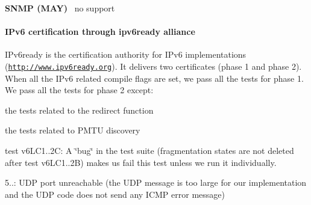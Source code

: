 {\bfseries S\+N\+MP (M\+AY)}~\newline
 no support\hypertarget{a00075_ipv6ready}{}\paragraph{I\+Pv6 certification through ipv6ready alliance}\label{a00075_ipv6ready}
I\+Pv6ready is the certification authority for I\+Pv6 implementations (\href{http://www.ipv6ready.org}{\tt http\+://www.\+ipv6ready.\+org}). It delivers two certificates (phase 1 and phase 2).~\newline
When all the I\+Pv6 related compile flags are set, we pass all the tests for phase 1.~\newline
We pass all the tests for phase 2 except\+: \begin{DoxyItemize}
\item the tests related to the redirect function \item the tests related to P\+M\+TU discovery \item test v6\+L\+C1..\+2C\+: A \char`\"{}bug\char`\"{} in the test suite (fragmentation states are not deleted after test v6\+L\+C1..\+2B) makes us fail this test unless we run it individually. \item 5..\+: U\+DP port unreachable (the U\+DP message is too large for our implementation and the U\+DP code does not send any I\+C\+MP error message)\end{DoxyItemize}


 